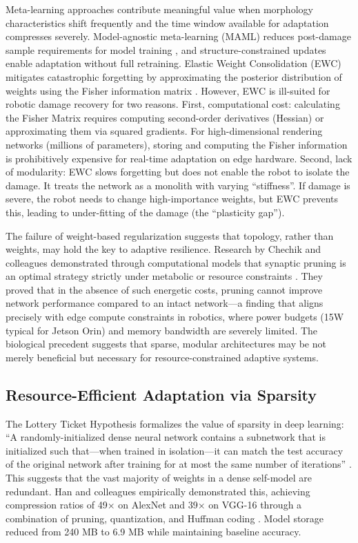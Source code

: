 \documentclass[12pt,a4paper,oneside]{report}
\begin{document}
Meta-learning approaches contribute meaningful value when morphology characteristics shift frequently and the time window available for adaptation compresses severely. Model-agnostic meta-learning (MAML) reduces post-damage sample requirements for model training \cite{finn2017maml}, and structure-constrained updates enable adaptation without full retraining. Elastic Weight Consolidation (EWC) mitigates catastrophic forgetting by approximating the posterior distribution of weights using the Fisher information matrix \cite{kirkpatrick2017overcoming}. However, EWC is ill-suited for robotic damage recovery for two reasons. First, computational cost: calculating the Fisher Matrix requires computing second-order derivatives (Hessian) or approximating them via squared gradients. For high-dimensional rendering networks (millions of parameters), storing and computing the Fisher information is prohibitively expensive for real-time adaptation on edge hardware. Second, lack of modularity: EWC slows forgetting but does not enable the robot to isolate the damage. It treats the network as a monolith with varying ``stiffness''. If damage is severe, the robot needs to change high-importance weights, but EWC prevents this, leading to under-fitting of the damage (the ``plasticity gap'').

The failure of weight-based regularization suggests that topology, rather than weights, may hold the key to adaptive resilience. Research by Chechik and colleagues demonstrated through computational models that synaptic pruning is an optimal strategy strictly under metabolic or resource constraints \cite{chechik1998synaptic}. They proved that in the absence of such energetic costs, pruning cannot improve network performance compared to an intact network—a finding that aligns precisely with edge compute constraints in robotics, where power budgets (15W typical for Jetson Orin) and memory bandwidth are severely limited. The biological precedent suggests that sparse, modular architectures may be not merely beneficial but necessary for resource-constrained adaptive systems.

\subsection{Resource-Efficient Adaptation via Sparsity}
\label{subsec:resource_efficient_adaptation_via_sparsity}

The Lottery Ticket Hypothesis formalizes the value of sparsity in deep learning: ``A randomly-initialized dense neural network contains a subnetwork that is initialized such that—when trained in isolation—it can match the test accuracy of the original network after training for at most the same number of iterations'' \cite{frankle2018lottery}. This suggests that the vast majority of weights in a dense self-model are redundant. Han and colleagues empirically demonstrated this, achieving compression ratios of 49× on AlexNet and 39× on VGG-16 through a combination of pruning, quantization, and Huffman coding \cite{han2015deep}. Model storage reduced from 240 MB to 6.9 MB while maintaining baseline accuracy.
\end{document}
